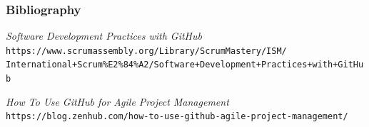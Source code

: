 \documentclass{beamer}
\begin{document}
\begin{frame}
    \frametitle{Bibliography}
	\begin{thebibliography}{10}

	\textit{Software Development Practices with GitHub} \\
	\texttt{https://www.scrumassembly.org/Library/ScrumMastery/ISM/\\
	International+Scrum\%E2\%84\%A2/Software+Development+Practices+with+GitHub}

	\textit{How To Use GitHub for Agile Project Management} \\
	\texttt{https://blog.zenhub.com/how-to-use-github-agile-project-management/}
	\end{thebibliography}
\end{frame}
\end{document}
